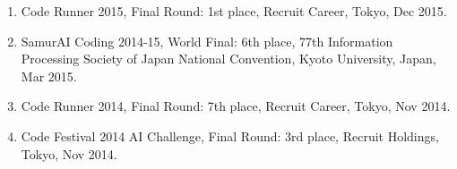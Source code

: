 \documentclass[a4j,twocolumn]{jarticle}
\begin{document}
\begin{enumerate}
 \item Code Runner 2015, Final Round: 1st place, Recruit Career, Tokyo, Dec 2015.
 \item SamurAI Coding 2014-15, World Final: 6th place, 77th Information Processing Society of Japan National Convention, Kyoto University, Japan, Mar 2015.
 \item Code Runner 2014, Final Round: 7th place, Recruit Career, Tokyo, Nov 2014.
 \item Code Festival 2014 AI Challenge, Final Round: 3rd place, Recruit Holdings, Tokyo, Nov 2014.
\end{enumerate}

\vspace{0.4cm}

\end{document}
